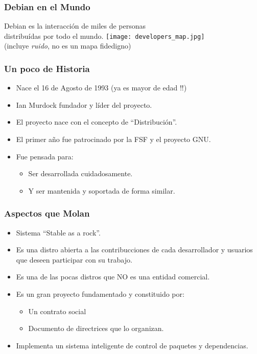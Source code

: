 \documentclass{beamer}
\begin{document}
\begin{frame}
  \frametitle {Debian en el Mundo}
  \begin{center}
    Debian es la interacción de miles de personas 
    \\distribuídas por todo el mundo.
    \texttt{[image: developers\_map.jpg]}\\
    {\scriptsize (incluye {\em ruido}, no es un mapa fidedigno)}
  \end{center}
\end{frame}

\begin{frame}
  \frametitle {Un poco de Historia}
  \begin{itemize}
    \item Nace el 16 de Agosto de 1993 (ya es mayor de edad !!)
    \item Ian Murdock fundador y líder del proyecto.
    \item El proyecto nace con el concepto de “Distribución”.
    \item El primer año fue patrocinado por la FSF y el proyecto GNU.
    \item Fue pensada para:
      \begin{itemize}
        \item Ser desarrollada cuidadosamente.
        \item Y ser mantenida y soportada de forma similar.
      \end{itemize}
  \end{itemize}
\end{frame}

\begin{frame}
  \frametitle {Aspectos que Molan}
  \begin{itemize}
    \item Sistema “Stable as a rock”.
    \item Es una distro abierta a las contribucciones de cada desarrollador y usuarios que deseen participar con su trabajo.
    \item Es una de las pocas distros que NO es una entidad comercial.
    \item Es un gran proyecto fundamentado y constituido por: 
      \begin{itemize}
      \item Un contrato social  
      \item Documento de directrices que lo organizan.
      \end{itemize}
    \item Implementa un sistema inteligente de control de paquetes y dependencias.
  \end{itemize}
\end{frame}
\end{document}
